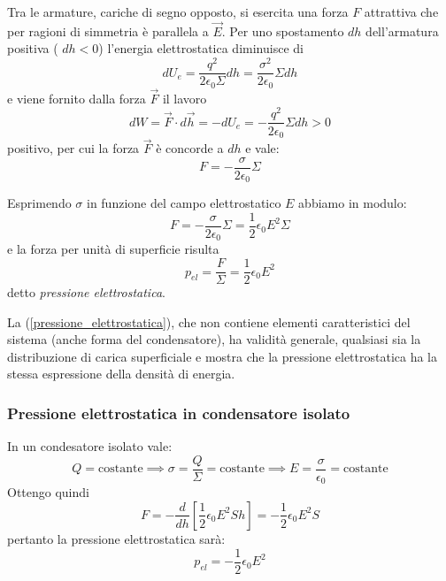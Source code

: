 \documentclass[class=book, crop=false, oneside, 12pt]{standalone}
\begin{document}
Tra le armature, cariche di segno opposto, si esercita una forza \(F\) attrattiva che per ragioni di simmetria è parallela a \(\overrightarrow{E}\).  
Per uno spostamento \(dh\) dell'armatura positiva ( \(dh < 0\)) l'energia elettrostatica diminuisce di
\begin{equation*}
    d U_e = \frac{q^2}{2 \epsilon_0 \Sigma} dh = \frac{\sigma^2}{2 \epsilon_0}  \Sigma dh
\end{equation*}
e viene fornito dalla forza \(\overrightarrow{F}\) il lavoro
\begin{equation*}
    d W = \overrightarrow{F} \cdot d \overrightarrow{h} = - d U_e = - \frac{q^2}{2 \epsilon_0} \Sigma dh > 0
\end{equation*}
positivo, per cui la forza \(\overrightarrow{F}\) è concorde a \(dh\) e vale:
\begin{equation}
    F =  - \frac{\sigma}{2 \epsilon_0} \Sigma 
\end{equation}

Esprimendo \(\sigma\) in funzione del campo elettrostatico \(E\) abbiamo in modulo:
\begin{equation*}
    F =  - \frac{\sigma}{2 \epsilon_0} \Sigma = \frac{1}{2} \epsilon_0 E^2 \Sigma
\end{equation*}
e la forza per unità di superficie risulta 
\begin{equation} \label{pressione_elettrostatica}
    p_{el} = \frac{F}{\Sigma} = \frac{1}{2} \epsilon_0 E^2
\end{equation} 
detto \emph{pressione elettrostatica}.

La (\ref{pressione_elettrostatica}), che non contiene elementi caratteristici del sistema (anche forma del condensatore), ha validità generale, qualsiasi sia la distribuzione di carica superficiale e mostra che la pressione elettrostatica ha la stessa espressione della densità di energia. 

\subsubsection*{Pressione elettrostatica in condensatore isolato}

In un condesatore isolato vale:
\begin{equation*}
    Q = \text{costante} \implies \sigma = \frac{Q}{\Sigma} = \text{costante} \implies E = \frac{\sigma}{\epsilon_0} = \text{costante}
\end{equation*}
Ottengo quindi
\begin{equation*}
    F = - \frac{d}{dh} \left[\frac{1}{2} \epsilon_0 E^2 S h\right] = - \frac{1}{2} \epsilon_0 E^2 S
\end{equation*}
pertanto la pressione elettrostatica sarà:
\begin{equation*}
    p_{el} = - \frac{1}{2} \epsilon_0 E^2
\end{equation*}
\end{document}
